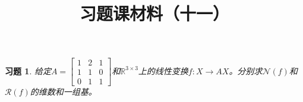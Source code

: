 \documentclass[UTF8]{ctexart}
\newtheorem{ex}[thm]{习题}
\begin{document}
\title{习题课材料（十一）}

\date{}

\maketitle

\vspace{-1cm}




\begin{ex}
给定$A = \begin{bmatrix}
1 & 2 & 1 \\
1 & 1 & 0 \\
0 & 1 & 1
\end{bmatrix}$和$\mathbb{R}^{3 \times 3}$上的线性变换$f: X \to AX$。分别求$\mathcal{N}(f)$和$\mathcal{R}(f)$的维数和一组基。
\end{ex}
\end{document}
